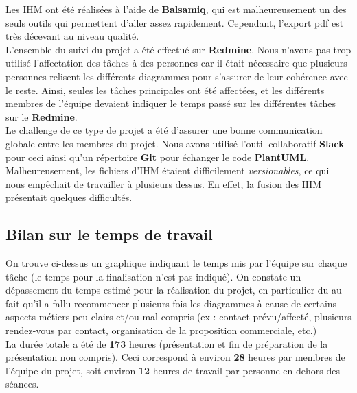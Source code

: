 Les IHM ont été réalisées à l'aide de \textbf{Balsamiq}, qui est malheureusement un des seuls outils qui permettent d'aller assez rapidement. Cependant, l'export pdf est très décevant au niveau qualité. \\

L'ensemble du suivi du projet a été effectué sur \textbf{Redmine}. Nous n'avons pas trop utilisé l’affectation des tâches à des personnes car il était nécessaire que plusieurs personnes relisent les différents diagrammes pour s'assurer de leur cohérence avec le reste. Ainsi, seules les tâches principales ont été affectées, et les différents membres de l'équipe devaient indiquer le temps passé sur les différentes tâches sur le \textbf{Redmine}.\\

Le challenge de ce type de projet a été d'assurer une bonne communication globale entre les membres du projet. Nous avons utilisé l'outil collaboratif \textbf{Slack} pour ceci ainsi qu’un répertoire \textbf{Git} pour échanger le code \textbf{PlantUML}. Malheureusement, les fichiers d'IHM étaient difficilement \textit{versionables}, ce qui nous empêchait de travailler à plusieurs dessus. En effet, la fusion des IHM présentait quelques difficultés.

\subsection*{Bilan sur le temps de travail}
  \begin{figure}[H]
    
  \end{figure}
  
On trouve ci-dessus un graphique indiquant le temps mis par l'équipe sur chaque tâche (le temps pour la finalisation n'est pas indiqué).
On constate un dépassement du temps estimé pour la réalisation du projet, en particulier du au fait qu'il a fallu recommencer plusieurs fois les diagrammes à cause de certains aspects métiers peu clairs et/ou mal compris (ex : contact prévu/affecté, plusieurs rendez-vous par contact, organisation de la proposition commerciale, etc.)\\

La durée totale a été de \textbf{173} heures (présentation et fin de préparation de la présentation non compris). Ceci correspond à environ \textbf{28} heures par membres de l'équipe du projet, soit environ \textbf{12} heures de travail par personne en dehors des séances.\\

